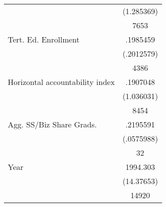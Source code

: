 {\begin{longtable}{l*{1}{c}}
                    &  (1.285369)\\
                    &        7653\\
Tert. Ed. Enrollment&    .1985459\\
                    &  (.2012579)\\
                    &        4386\\
Horizontal accountability index&    .1907048\\
                    &  (1.036031)\\
                    &        8454\\
Agg. SS/Biz Share Grads.&    .2195591\\
                    &  (.0575988)\\
                    &          32\\
Year                &    1994.303\\
                    &  (14.37653)\\
                    &       14920\\
\hline\hline
\end{longtable}
}
